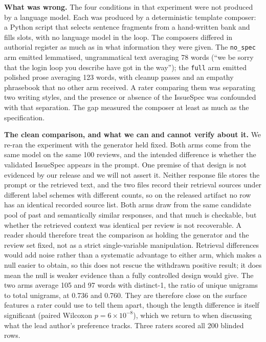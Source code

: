 \documentclass[preprint,12pt]{elsarticle}
\begin{document}
\textbf{What was wrong.} The four conditions in that experiment were not produced by a language
model. Each was produced by a deterministic template composer: a Python script that selects sentence
fragments from a hand-written bank and fills slots, with no language model in the loop. The
composers differed in authorial register as much as in what information they were given. The \texttt{no\_spec} arm
emitted lemmatised, ungrammatical text averaging 78 words (``we be sorry that the login loop you
describe have got in the way''); the \texttt{full} arm emitted polished prose averaging 123 words,
with cleanup passes and an empathy phrasebook that no other arm received. A rater comparing them
was separating two writing styles, and the presence or absence of the IssueSpec was confounded
with that separation. The gap measured the composer at least as much as the specification.

\textbf{The clean comparison, and what we can and cannot verify about it.} We re-ran the
experiment with the generator held fixed. Both arms come from the same model on the same 100
reviews, and the intended difference is whether the validated IssueSpec appears in the prompt.
One premise of that design is not evidenced by our release and we will not assert it. Neither
response file stores the prompt or the retrieved text, and the two files record their retrieval
sources under different label schemes with different counts, so on the released artifact no row
has an identical recorded source list. Both arms draw from the same candidate pool of past and
semantically similar responses, and that much is checkable, but whether the retrieved context was
identical per review is not recoverable. A reader should therefore treat the comparison as
holding the generator and the review set fixed, not as a strict single-variable manipulation.
Retrieval differences would add noise rather than a systematic advantage to either arm, which
makes a null easier to obtain, so this does not rescue the withdrawn positive result; it does
mean the null is weaker evidence than a fully controlled design would give. The two
arms average 105 and 97 words with distinct-1, the ratio of unique unigrams to total unigrams, at 0.736 and 0.760. They are
therefore close on the surface features a rater could use to tell them apart, though the length
difference is itself significant (paired Wilcoxon $p = 6 \times 10^{-8}$), which we return to
when discussing what the lead author's preference tracks. Three raters scored all 200 blinded rows.
\end{document}
